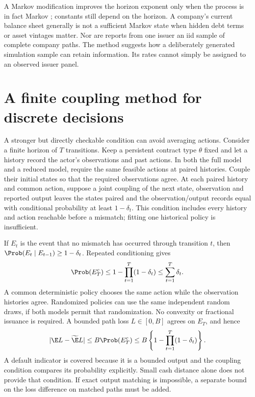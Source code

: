 A Markov modification improves the horizon exponent only when the process
is in fact Markov \cite[Theorem~6.1]{litcloseestimation}; constants still depend on
the horizon. A company's current balance sheet generally is not a sufficient
Markov state when hidden debt terms or asset vintages matter. Nor are reports
from one issuer an iid sample of complete company paths. The method suggests
how a deliberately generated simulation sample can retain information. Its
rates cannot simply be assigned to an observed issuer panel.

\section{A finite coupling method for discrete decisions}
A stronger but directly checkable condition can avoid averaging actions.
Consider a finite horizon of $T$ transitions. Keep a persistent contract type
$\theta$ fixed and let a history record the actor's observations and past
actions. In both the full model and a reduced model, require the same feasible
actions at paired histories. Couple their initial states so that the required
observations agree. At each paired history and common action, suppose a joint
coupling of the next state, observation and reported output leaves the states
paired and the observation/output records equal with conditional probability
at least $1-\delta_t$. This condition includes every history and action reachable
before a mismatch; fitting one historical policy is insufficient.

If $E_t$ is the event that no mismatch has occurred through transition $t$,
then $\Prob(E_t\mid E_{t-1})\ge1-\delta_t$. Repeated conditioning gives
\begin{equation}
\Prob(E_T^c)\le1-\prod_{t=1}^T(1-\delta_t)
\le\sum_{t=1}^T\delta_t.
\label{sim:lit-finite-coupling}
\end{equation}
A common deterministic policy chooses the same action while the observation
histories agree. Randomized policies can use the same independent random draws,
if both models permit that randomization. No convexity or fractional issuance
is required. A bounded path loss $L\in[0,B]$ agrees on $E_T$, and hence
\begin{equation}
|\E L-\widetilde\E L|
\le B\Prob(E_T^c)
\le B\left\{1-\prod_{t=1}^T(1-\delta_t)\right\}.
\label{sim:lit-finite-cost}
\end{equation}
A default indicator is covered because it is a bounded output and the
coupling condition compares its probability explicitly. Small cash distance
alone does not provide that condition. If exact output matching is impossible,
a separate bound on the loss difference on matched paths must be added.


